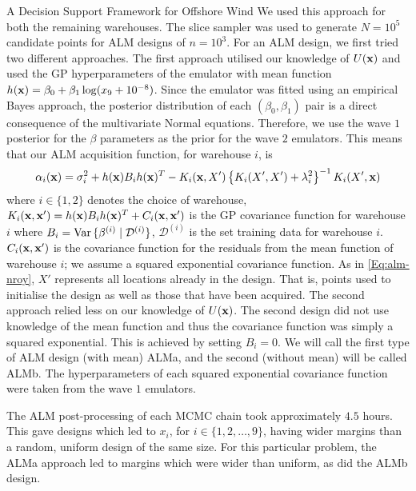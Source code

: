 \begin{chapter}{A Decision Support Framework for Offshore Wind \label{Ch:ds-for-ow}}
We used this approach for both the remaining warehouses. The slice sampler was used to generate $N = 10^5$ candidate points for ALM designs of $n = 10^3$. For an ALM design, we first tried two different approaches. The first approach utilised our knowledge of $U(\mathbf{x})$ and used the GP hyperparameters of the emulator with mean function $h(\mathbf{x}) = \beta_0 + \beta_1 \log (x_9 + 10^{-8})$. Since the emulator was fitted using an empirical Bayes approach, the posterior distribution of each $(\beta_0, \beta_1)$ pair is a direct consequence of the multivariate Normal equations. Therefore, we use the wave $1$ posterior for the $\beta$ parameters as the prior for the wave $2$ emulators. This means that our ALM acquisition function, for warehouse $i$, is
\begin{eqnarray}
 \alpha_i(\mathbf{x}) = \sigma^{2}_{i} + h(\mathbf{x})B_ih(\mathbf{x})^T - K_i(\mathbf{x}, X') \left\{K_i(X', X') + \lambda_i^2\right\}^{-1} K_i(X', \mathbf{x}) \label{Eq:alm-nroy}
\end{eqnarray}
where $i \in \{1, 2\}$ denotes the choice of warehouse, $K_i(\mathbf{x}, \mathbf{x}') = h(\mathbf{x}) B_i h(\mathbf{x})^T + C_i(\mathbf{x}, \mathbf{x}')$ is the GP covariance function for warehouse $i$ where $B_i = \mathrm{Var}\,\{\beta^{(i)} \mid \mathcal{D}^{(i)} \}$, $\mathcal{D}^{(i)}$ is the set training data for warehouse $i$. $C_i(\mathbf{x}, \mathbf{x}')$ is the covariance function for the residuals from the mean function of warehouse $i$; we assume a squared exponential covariance function. As in \cref{Eq:alm-nroy}, $X'$ represents all locations already in the design. That is, points used to initialise the design as well as those that have been acquired. The second approach relied less on our knowledge of $U(\mathbf{x})$. The second design did not use knowledge of the mean function and thus the covariance function was simply a squared exponential. This is achieved by setting $B_i = 0$. We will call the first type of ALM design (with mean) ALMa, and the second (without mean) will be called ALMb. The hyperparameters of each squared exponential covariance function were taken from the wave $1$ emulators.

The ALM post-processing of each MCMC chain took approximately $4.5$ hours. This gave designs which led to $x_i$, for $i \in \{1, 2, \ldots, 9\}$, having wider margins than a random, uniform design of the same size. For this particular problem, the ALMa approach led to margins which were wider than uniform, as did the ALMb design.


\end{chapter}
